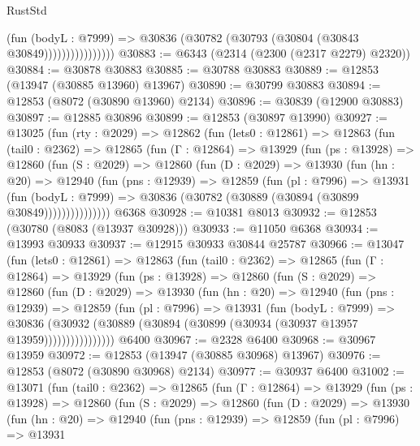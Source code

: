 \begin{lexlean}{RustStd}
\begin{coremodule}
                          (fun (bodyL : @7999) =>
                          @30836 (@30782 (@30793 (@30804 (@30843 @30849))))))))))))))))
@30883 := @6343 (@2314 (@2300 (@2317 @2279) @2320))
@30884 := @30878 @30883
@30885 := @30788 @30883
@30889 := @12853 (@13947 (@30885 @13960) @13967)
@30890 := @30799 @30883
@30894 := @12853 (@8072 (@30890 @13960) @2134)
@30896 := @30839 (@12900 @30883)
@30897 := @12885 @30896
@30899 := @12853 (@30897 @13990)
@30927 := @13025
    (fun (rty : @2029) =>
    @12862
      (fun (lets0 : @12861) =>
      @12863
        (fun (tail0 : @2362) =>
        @12865
          (fun (Γ : @12864) =>
          @13929
            (fun (ps : @13928) =>
            @12860
              (fun (S : @2029) =>
              @12860
                (fun (D : @2029) =>
                @13930
                  (fun (hn : @20) =>
                  @12940
                    (fun (pns : @12939) =>
                    @12859
                      (fun (pl : @7996) =>
                      @13931
                        (fun (bodyL : @7999) =>
                        @30836 (@30782 (@30889 (@30894 (@30899 @30849)))))))))))))))
    @6368
@30928 := @10381 @8013
@30932 := @12853 (@30780 (@8083 (@13937 @30928)))
@30933 := @11050 @6368
@30934 := @13993 @30933
@30937 := @12915 @30933 @30844 @25787
@30966 := @13047
    (fun (lets0 : @12861) =>
    @12863
      (fun (tail0 : @2362) =>
      @12865
        (fun (Γ : @12864) =>
        @13929
          (fun (ps : @13928) =>
          @12860
            (fun (S : @2029) =>
            @12860
              (fun (D : @2029) =>
              @13930
                (fun (hn : @20) =>
                @12940
                  (fun (pns : @12939) =>
                  @12859
                    (fun (pl : @7996) =>
                    @13931
                      (fun (bodyL : @7999) =>
                      @30836
                        (@30932
                          (@30889 (@30894 (@30899 (@30934 (@30937 @13957 @13959))))))))))))))))
    @6400
@30967 := @2328 @6400
@30968 := @30967 @13959
@30972 := @12853 (@13947 (@30885 @30968) @13967)
@30976 := @12853 (@8072 (@30890 @30968) @2134)
@30977 := @30937 @6400
@31002 := @13071
    (fun (tail0 : @2362) =>
    @12865
      (fun (Γ : @12864) =>
      @13929
        (fun (ps : @13928) =>
        @12860
          (fun (S : @2029) =>
          @12860
            (fun (D : @2029) =>
            @13930
              (fun (hn : @20) =>
              @12940
                (fun (pns : @12939) =>
                @12859
                  (fun (pl : @7996) =>
                  @13931

\end{coremodule}
\end{lexlean}

